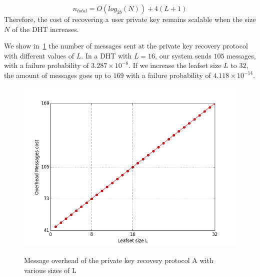     $$
      n_{total} = O(log_{2b}(N)) + 4(L+1)
    $$
    Therefore, the cost of recovering a user private key remains
scalable when the size $N$ of the DHT increases.

    We show in~\ref{fig:private_key_recovery_a_messages} the number of messages sent at
the private key recovery protocol with different values of $L$. In a DHT with
$L = 16$, our system sends $105$ messages, with a failure probability of
 $3.287 \times 10^{-8}$. If we increase the leafset size $L$ to $32$, the amount of
messages goes up to $169$ with a failure probability of $4.118 \times 10^{-14}$.

\begin{figure}[!htb]
\centering
\includegraphics[width=14cm]{../plots/private_key_recovery_a_messages}\\
\caption{Message overhead of the private key recovery protocol A with various sizes of L}
\label{fig:private_key_recovery_a_messages}
\end{figure}
